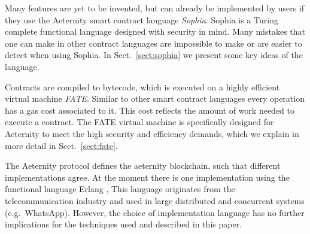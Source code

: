 Many features are yet to be invented, but can already be implemented
by users if they use the Aeternity smart contract language
\textit{Sophia}. Sophia is a Turing complete functional language
designed with security in mind. Many mistakes that one can make in
other contract languages are impossible to make or are easier to detect
when using Sophia. In Sect.\ \ref{sect:sophia} we present some key
ideas of the language.

Contracts are compiled to bytecode, which is executed on a highly
efficient virtual machine \textit{FATE}. Similar to other smart contract
languages every operation has a gas cost associated to it. This cost reflects
the amount of work needed to execute a contract. The FATE virtual machine is specifically designed for
Aeternity to meet the high security and efficiency demands, which we
explain in more detail in Sect.~\ref{sect:fate}.

The Aeternity protocol defines the aeternity blockchain, such that
different implementations agree. At the moment there is one
implementation using the functional language Erlang
\cite{Armstrong:2010:ERL:1810891.1810910}, This language originates from the
telecommunication industry and used in large distributed and
concurrent systems (e.g.\ WhatsApp). However, the choice
of implementation language has no further
implications for the techniques used and described in this paper.
